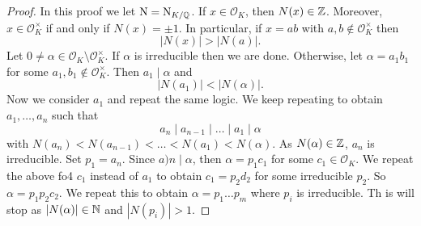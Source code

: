 \begin{proof}
	In this proof we let $\operatorname{N} = \operatorname{N}_{K/\mathbb{Q}}$.
	If $x \in \mathcal O_K$, then $N(x) \in \mathbb{Z}$.
	Moreover, $x \in \mathcal O_K^\times$ if and only if $N(x) = \pm 1$.
	In particular, if $x = ab$ with $a, b \not\in \mathcal O_K^\times$ then
	\[
		\left\lvert N(x) \right\rvert
		> \left\lvert N(a) \right\rvert.
	\]
	Let $0 \neq \alpha \in \mathcal O_K \setminus \mathcal O_K^\times$.
	If $\alpha$ is irreducible then we are done.
	Otherwise, let $\alpha = a_1 b_1$ for some 
	$a_1, b_1 \not\in \mathcal O_K^\times$.
	Then $a_1 \mid \alpha$ and
	\[
		\left\lvert N(a_1) \right\rvert
		< \left\lvert N(\alpha) \right\rvert.
	\]
	Now we consider $a_1$ and repeat the same logic.
	We keep repeating to obtain $a_1, \ldots, a_n$ such that
	\[
		a_n \mid a_{n-1} \mid \ldots \mid a_1 \mid \alpha
	\]
	with $N(a_n) < N(a_{n-1}) < \ldots < N(a_1) < N(\alpha)$.
	As $N(\alpha) \in \mathbb{Z}$, $a_n$ is irreducible.
	Set $p_1 = a_n$.
	Since $a)n \mid \alpha$, then $\alpha = p_1 c_1$ for some 
	$c_1 \in \mathcal O_K$.
	We repeat the above fo4 $c_1$ instead of $a_1$ to obtain
	$c_1 = p_2 d_2$ for some irreducible $p_2$.
	So $\alpha = p_1 p_2 c_2$.
	We repeat this to obtain $\alpha = p_1 \ldots p_m$ where
	$p_i$ is irreducible.
	Th is will stop as $\left\lvert N(\alpha) \right\rvert \in \mathbb{N}$
	and $\left\lvert N(p_i) \right\rvert > 1$.
\end{proof}
